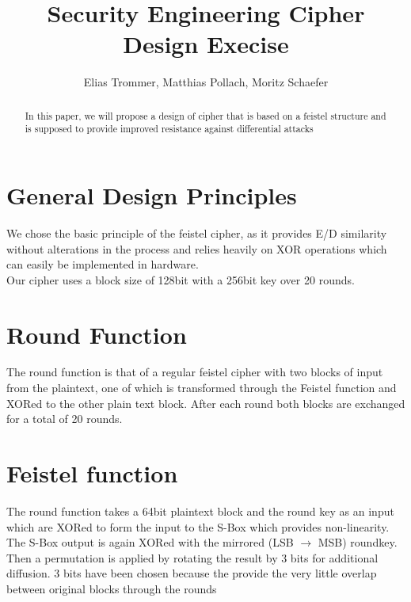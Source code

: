 \documentclass[a4paper]{article}
\begin{document}
    \title{Security Engineering Cipher Design Execise}
    \author{Elias Trommer, Matthias Pollach, Moritz Schaefer}
    \maketitle
    \begin{abstract}
	In this paper, we will propose a design of cipher that is based on a feistel structure and is supposed to provide improved resistance against differential attacks
    \end{abstract}
    \tableofcontents
    \section{General Design Principles}
    We chose the basic principle of the feistel cipher, as it provides E/D similarity without alterations in the process and relies heavily on XOR operations which can easily be implemented in hardware.\\[0.5em]
    Our cipher uses a block size of 128bit with a 256bit key over 20 rounds. 
    \section{Round Function}
	The round function is that of a regular feistel cipher with two blocks of input from the plaintext, one of which is transformed through the Feistel function and XORed to the other plain text block. After each round both blocks are exchanged for a total of 20 rounds.
    \section{Feistel function}
    The round function takes a 64bit plaintext block and the round key as an input which are XORed to form the input to the S-Box which provides non-linearity. The S-Box output is again XORed with the mirrored (LSB $\rightarrow$ MSB) roundkey. Then a permutation is applied by rotating the result by 3 bits for additional diffusion. 3 bits have been chosen because the provide the very little overlap between original blocks through the rounds
\end{document}

